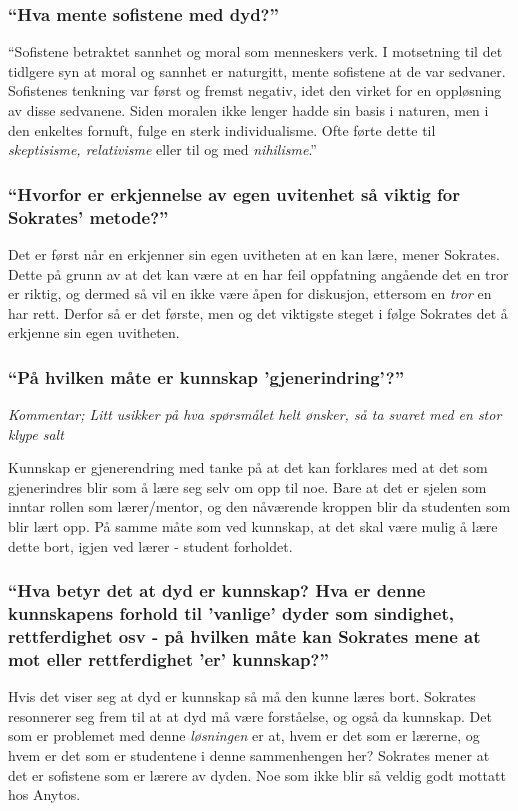 \documentclass[a4paper]{IEEEtran}
\begin{document}
        \subsubsection{``Hva mente sofistene med dyd?''}
        ``Sofistene betraktet sannhet og moral som menneskers verk. I motsetning til 
        det tidlgere syn at moral og sannhet er naturgitt, mente sofistene at de var 
        sedvaner. Sofistenes tenkning var først og fremst negativ, idet den virket for 
        en oppløsning av disse sedvanene. Siden moralen ikke lenger hadde sin basis
        i naturen, men i den enkeltes fornuft, fulge en sterk individualisme. Ofte
        førte dette til \textit{skeptisisme, relativisme} eller til og med 
        \textit{nihilisme}.'' \cite{snl_sofist} \medskip
        
        \subsubsection{``Hvorfor er erkjennelse av egen uvitenhet så viktig for Sokrates'
        metode?''}
        Det er først når en erkjenner sin egen uvitheten at en kan lære, mener Sokrates.
        Dette på grunn av at det kan være at en har feil oppfatning angående 
        det en tror er riktig, og dermed så vil en ikke være åpen for diskusjon, 
        ettersom en \textit{tror} en har rett. Derfor så er det første, 
        men og det viktigste steget i følge Sokrates det å erkjenne sin egen 
        uvitheten. \medskip

        \subsubsection{``På hvilken måte er kunnskap 'gjenerindring'?''}
        \textit{Kommentar; Litt usikker på hva spørsmålet helt ønsker, så ta svaret med 
        en stor klype salt}

        Kunnskap er gjenerendring med tanke på at det kan forklares med at 
        det som gjenerindres blir som å lære seg selv om opp til noe. 
        Bare at det er sjelen som inntar rollen som lærer/mentor, og den 
        nåværende kroppen blir da studenten som blir lært opp. På samme måte som ved 
        kunnskap, at det skal være mulig å lære dette bort, igjen ved lærer - student
        forholdet. \medskip

        \subsubsection{``Hva betyr det at dyd er kunnskap? 
        Hva er denne kunnskapens forhold til 'vanlige' dyder som 
        sindighet, rettferdighet osv - på hvilken måte kan Sokrates mene at mot
        eller rettferdighet 'er' kunnskap?''}
        Hvis det viser seg at dyd er kunnskap så må den kunne læres bort. Sokrates 
        resonnerer seg frem til at at dyd må være forståelse, og også da kunnskap. 
        Det som er problemet med denne \textit{løsningen} er at, hvem er det som er 
        lærerne, og hvem er det som er studentene i denne sammenhengen her? Sokrates 
        mener at det er sofistene som er lærere av dyden. Noe som ikke blir så 
        veldig godt mottatt hos Anytos. 
\end{document}
